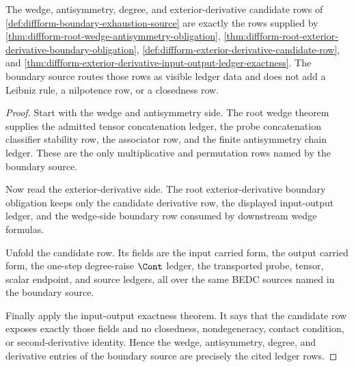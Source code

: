 \begin{theorem}
\label{thm:diffform-boundary-exhaustion-wedge-derivative-routing}
The wedge, antisymmetry, degree, and exterior-derivative candidate rows of
\autoref{def:diffform-boundary-exhaustion-source} are exactly the rows
supplied by
\autoref{thm:diffform-root-wedge-antisymmetry-obligation},
\autoref{thm:diffform-root-exterior-derivative-boundary-obligation},
\autoref{def:diffform-exterior-derivative-candidate-row}, and
\autoref{thm:diffform-exterior-derivative-input-output-ledger-exactness}.
The boundary source routes those rows as visible ledger data and does not add
a Leibniz rule, a nilpotence row, or a closedness row.
\end{theorem}
\begin{proof}
Start with the wedge and antisymmetry side. The root wedge theorem supplies
the admitted tensor concatenation ledger, the probe concatenation classifier
stability row, the associator row, and the finite antisymmetry chain ledger.
These are the only multiplicative and permutation rows named by the boundary
source.

Now read the exterior-derivative side. The root exterior-derivative boundary
obligation keeps only the candidate derivative row, the displayed
input-output ledger, and the wedge-side boundary row consumed by downstream
wedge formulas.

Unfold the candidate row. Its fields are the input carried form, the output
carried form, the one-step degree-raise $\Cont$ ledger, the transported
probe, tensor, scalar endpoint, and source ledgers, all over the same BEDC
sources named in the boundary source.

Finally apply the input-output exactness theorem. It says that the candidate
row exposes exactly those fields and no closedness, nondegeneracy, contact
condition, or second-derivative identity. Hence the wedge, antisymmetry,
degree, and derivative entries of the boundary source are precisely the cited
ledger rows.
\end{proof}

